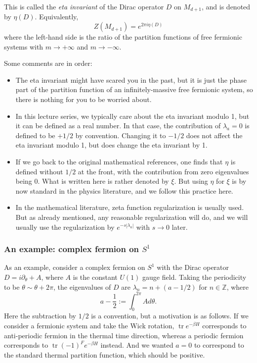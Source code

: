 \documentclass[12pt]{article}
\numberwithin{equation}{section}
\numberwithin{figure}{section}
\theoremstyle{remark}
\def\bZ{\mathbb{Z}}
\def\tr{\mathop{\mathrm{tr}}\nolimits}
\begin{document}
This is called the \emph{eta invariant} of the Dirac operator $D$ on $M_{d+1}$,
and is denoted by $\eta(D)$.  Equivalently, \begin{equation}
Z(M_{d+1})=e^{2\pi i\eta(D)}
\end{equation} where the left-hand side is the ratio of the partition functions
of free fermionic systems with $m\to +\infty$ and $m\to -\infty$.

Some comments are in order:
\begin{itemize}
\item The eta invariant might have scared you in the past, 
but it is just the phase part
of the partition function of an infinitely-massive free fermionic system,
so there is nothing for you to be worried about.
\item In this lecture series, we typically care about the eta invariant modulo 1, but it can be defined as a real number.
In that case, the contribution of $\lambda_a=0$ is defined to be $+1/2$ by convention.
Changing it to $-1/2$ does not affect the eta invariant modulo 1, 
but does change the eta invariant by 1.
\item If we go back to the original mathematical references,
one finds that $\eta$ is defined without $1/2$ at the front,
with the contribution from zero eigenvalues being $0$.
What is written here is rather denoted by $\xi$.
But using $\eta$ for $\xi$ is by now standard in the physics literature,
and we follow this practice here.
\item In the mathematical literature, zeta function regularization is usually used.
But as already mentioned, any reasonable regularization will do, and 
we will usually use the regularization by $e^{-s|\lambda_a|}$ with $s\to 0$ later.
\end{itemize}

\subsubsection{An example: complex fermion on $S^1$}

As an example,  consider a complex fermion on $S^1$
with the Dirac operator $D=i\partial_\theta+A$,
where $A$ is the constant $U(1)$ gauge field.
Taking the periodicity to be $\theta\sim \theta+2\pi$,
the eigenvalues of $D$ are $\lambda_n = n+(a-1/2)$ for $n\in \bZ$,
where \begin{equation}
a-\frac12  :=\int_{0}^{2\pi} A d\theta  .
\label{adef}
\end{equation}
Here the subtraction by $1/2$ is a convention, but a motivation is as follows.
If we consider a fermionic system and take the Wick rotation,
$\tr e^{-\beta H}$ corresponds to anti-periodic fermion in the thermal time direction,
whereas a periodic fermion corresponds to $\tr (-1)^F e^{-\beta H}$ instead.
And we wanted $a=0$ to correspond to the standard thermal partition function,
which should be positive.   
\end{document}
